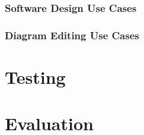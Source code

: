 \documentclass[a4paper]{article}
\begin{document}
		\subsubsection{Software Design Use Cases}
		\subsubsection{Diagram Editing Use Cases}
\section{Testing}
	
\section{Evaluation}
\end{document}
